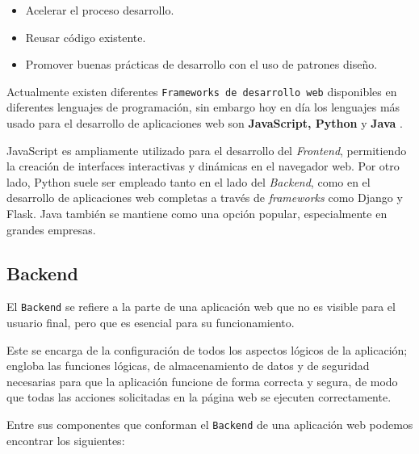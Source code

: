 \begin{itemize}
    \item Acelerar el proceso desarrollo.
    \item Reusar código existente.
    \item Promover buenas prácticas de desarrollo con el uso de patrones diseño.    
\end{itemize}

Actualmente existen diferentes \texttt{Frameworks de desarrollo web} disponibles en diferentes lenguajes de programación, sin embargo hoy en día los lenguajes más usado para el desarrollo de aplicaciones web son \textbf{JavaScript, Python} y \textbf{Java} \cite{joana_martini}. 

JavaScript es ampliamente utilizado para el desarrollo del  \textit{Frontend}, permitiendo la creación de interfaces interactivas y dinámicas en el navegador web. 
Por otro lado, Python suele ser empleado tanto en el lado del \textit{Backend}, como en el desarrollo de aplicaciones web completas a través de \textit{frameworks} como Django y Flask.  Java también se mantiene como una opción popular, especialmente en grandes empresas.

\subsection{Backend}

El \texttt{Backend} se refiere a la parte de una aplicación web que no es visible para el usuario final, pero que es esencial para su funcionamiento. 

Este se encarga de la configuración de todos los aspectos lógicos de la aplicación; engloba las funciones lógicas, de almacenamiento de datos y de seguridad necesarias para que la aplicación funcione de forma correcta y segura, de modo que todas las acciones solicitadas en la página web se ejecuten correctamente.


Entre sus componentes que conforman el \texttt{Backend} de una aplicación web podemos encontrar los siguientes:

